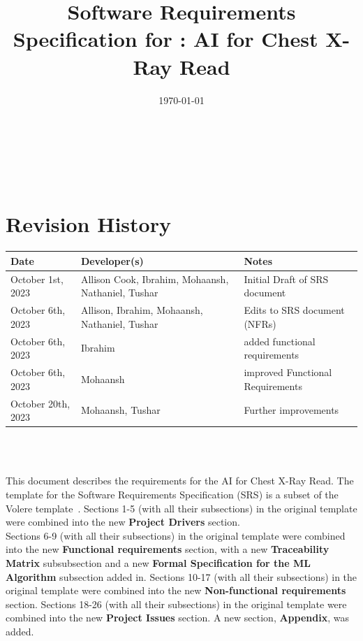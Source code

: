 \documentclass[12pt]{article}
\begin{document}
\title{Software Requirements Specification for \progname: AI for Chest X-Ray Read}
\author{\authname}
\date{\today}
  
\maketitle

~\newpage


\tableofcontents

~\newpage

\section*{Revision History}

\begin{tabularx}{\textwidth}{p{4cm}p{4cm}X}
\toprule {\textbf{Date}} & {\textbf{Developer(s)}} & {\textbf{Notes}}\\
\midrule
October 1st, 2023 & Allison Cook, Ibrahim, Mohaansh, Nathaniel,
Tushar & Initial Draft of SRS document \\
October 6th, 2023 & Allison, Ibrahim, Mohaansh, Nathaniel, Tushar & Edits to SRS document (NFRs) \\
October 6th, 2023 & Ibrahim & added functional requirements \\
October 6th, 2023 & Mohaansh & improved Functional Requirements \\
October 20th, 2023 & Mohaansh, Tushar & Further improvements \\

\bottomrule
\end{tabularx}

~\\

~\newpage


\noindent This document describes the requirements for the AI for Chest X-Ray Read. The template for the
Software Requirements Specification (SRS) is a subset of the Volere
template~\citep{RobertsonAndRobertson2012}.
Sections 1-5 (with all their subsections) in the original template were combined into the new \textbf{Project Drivers} section. \\

\noindent Sections 6-9 (with all their subsections) in the original template were combined into the new \textbf{Functional requirements} section, with a new \textbf{Traceability Matrix} subsubsection and a new \textbf{Formal Specification for the ML Algorithm} subsection added in.
Sections 10-17 (with all their subsections) in the original template were combined into the new \textbf{Non-functional requirements} section. Sections 18-26 (with all their subsections) in the original template were combined into the new \textbf{Project Issues} section. A new section, \textbf{Appendix}, was added.
\end{document}
